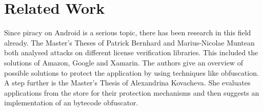 \section{Related Work}\label{section:introduction-related}
Since piracy on Android is a serious topic, there has been research in this field already.
\newline
\newline
The Master's Theses of Patrick Bernhard \cite{bernhardSecurity} and Marius-Nicolae Muntean \cite{kovachevaMaster} both analysed attacks on different license verification libraries.
This included the solutions of Amazon, Google and Xamarin.
The authors give an overview of possible solutions to protect the application by using techniques like obfuscation.
\newline
A step further is the Master's Thesis of Alexandrina Kovacheva. She evaluates applications from the store for their protection mechanisms and then suggests an implementation of an bytecode obfuscator.
